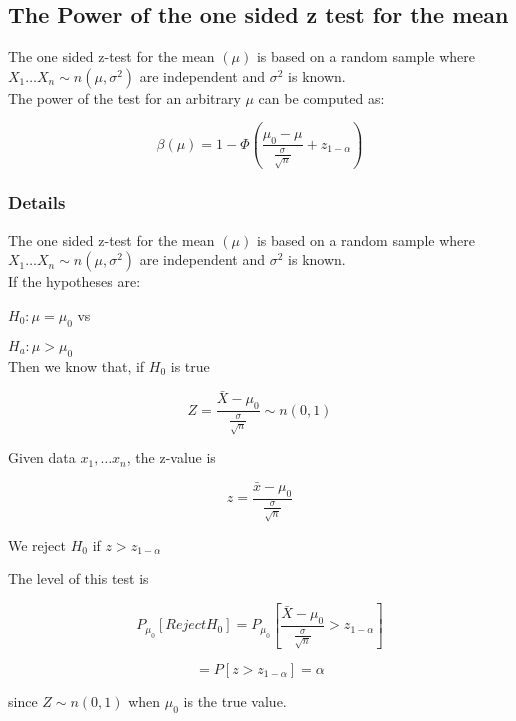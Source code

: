 \documentclass[12pt,a4paper]{article}
\theoremstyle{regla}
\theoremstyle{remark}
\theoremstyle{definition}
\theoremstyle{nonumberbreak}
\begin{document}
\subsection{The Power of the one sided z test for the mean}
\begin{fbox}
\begin{minipage}{0.97\textwidth}
The one sided z-test for the mean $(\mu)$ is based on a random sample where $X_1 \ldots X_n \sim n(\mu, \sigma^2)$ are independent and $\sigma^2$ is known.\\

The power of the test for an arbitrary $\mu $ can be computed as:

$$
\beta(\mu) = 1 - \Phi \left ( \frac{\mu_0 - \mu }{\frac{\sigma} {\sqrt{n}}} + z_{1- \alpha} \right )
$$

\end{minipage}
\end{fbox}
\subsubsection{Details}
The one sided z-test for the mean $(\mu)$ is based on a random sample where $X_1 \ldots X_n \sim n(\mu, \sigma^2)$ are independent and $\sigma^2$ is known.\\

If the hypotheses are:

$ H_0 : \mu = \mu_0$ vs

$ H_a : \mu > \mu_0$\\

Then we know that, if $H_0$ is true

$$Z = \frac{\bar {X} - \mu_0}{\frac{\sigma} {\sqrt{n}}} \sim n (0,1)$$


Given data $x_1, \ldots x_n$, the z-value is

$$z = \frac{\bar {x} - \mu_0}{\frac{\sigma} {\sqrt{n}}}$$

We reject $H_0$ if $z > z_{1-\alpha}$

The level of this test is 

$$
P_{\mu_0} [Reject H_0]= P_{\mu_0}[\frac{\bar {X} - \mu_0}{\frac{\sigma} {\sqrt{n}}} > z_{1- \alpha}]
$$

 $$= P[z > z_{1- \alpha}] = {\alpha} $$

since $ Z \sim n (0,1)$ when $\mu_0$ is the true value.\\\\
 
\end{document}
